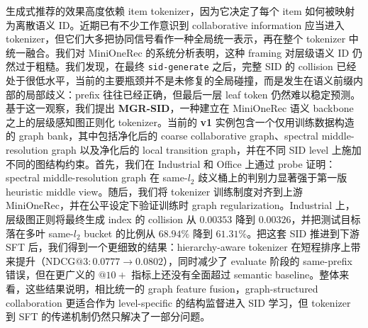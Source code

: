 生成式推荐的效果高度依赖 item tokenizer，因为它决定了每个 item 如何被映射为离散语义 ID。近期已有不少工作意识到 collaborative information 应当进入 tokenizer，但它们大多把协同信号看作一种全局统一表示，再在整个 tokenizer 中统一融合。我们对 MiniOneRec 的系统分析表明，这种 framing 对层级语义 ID 仍然过于粗糙。我们发现，在最终 \texttt{sid-generate} 之后，完整 SID 的 collision 已经处于很低水平，当前的主要瓶颈并不是未修复的全局碰撞，而是发生在语义前缀内部的局部歧义：prefix 往往已经正确，但最后一层 leaf token 仍然难以稳定预测。基于这一观察，我们提出 \textbf{MGR-SID}，一种建立在 MiniOneRec 语义 \rqvae{} backbone 之上的层级感知图正则化 tokenizer。当前的 \textbf{v1} 实例包含一个仅用训练数据构造的 graph bank，其中包括净化后的 coarse collaborative graph、spectral middle-resolution graph 以及净化后的 local transition graph，并在不同 SID level 上施加不同的图结构约束。首先，我们在 Industrial 和 Office 上通过 probe 证明：spectral middle-resolution graph 在 same-$l_2$ 歧义桶上的判别力显著强于第一版 heuristic middle view。随后，我们将 tokenizer 训练制度对齐到上游 MiniOneRec，并在公平设定下验证训练时 graph regularization。Industrial 上，层级图正则将最终生成 index 的 collision 从 $0.00353$ 降到 $0.00326$，并把测试目标落在多叶 same-$l_2$ bucket 的比例从 $68.94\%$ 降到 $61.31\%$。把这套 SID 推进到下游 SFT 后，我们得到一个更细致的结果：hierarchy-aware tokenizer 在短程排序上带来提升（$\mathrm{NDCG}@3: 0.0777 \rightarrow 0.0802$），同时减少了 evaluate 阶段的 same-prefix 错误，但在更广义的 $@10+$ 指标上还没有全面超过 semantic baseline。整体来看，这些结果说明，相比统一的 graph feature fusion，graph-structured collaboration 更适合作为 level-specific 的结构监督进入 SID 学习，但 tokenizer 到 SFT 的传递机制仍然只解决了一部分问题。
